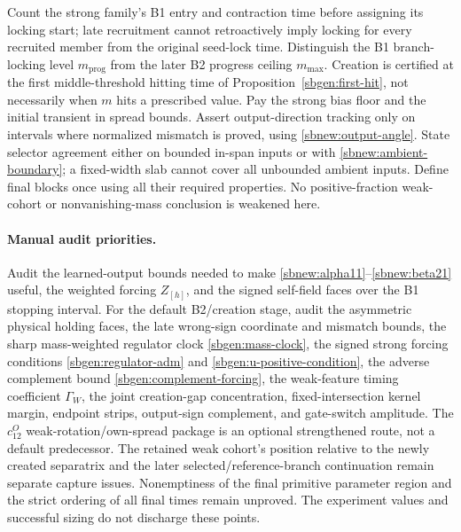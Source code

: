 \documentclass{article} %
\theoremstyle{plain}
\theoremstyle{definition}
\theoremstyle{remark}
\begin{document}
Count the strong family's B1 entry and contraction time before assigning its
locking start; late recruitment cannot retroactively imply locking for every
recruited member from the original seed-lock time. Distinguish the B1 branch-locking level $m_{\mathrm{prog}}$ from the
later B2 progress ceiling $m_{\max}$.  Creation is certified at the first
middle-threshold hitting time of Proposition~\ref{sbgen:first-hit}, not
necessarily when $m$ hits a prescribed value.  Pay the strong bias floor and
the initial transient in spread bounds. Assert output-direction tracking only on intervals where
normalized mismatch is proved, using \eqref{sbnew:output-angle}. State
selector agreement either on bounded in-span inputs or with
\eqref{sbnew:ambient-boundary}; a fixed-width slab cannot cover all unbounded
ambient inputs. Define final blocks once using all their required properties.
No positive-fraction weak-cohort or nonvanishing-mass conclusion is weakened
here.

\paragraph{Manual audit priorities.}
Audit the learned-output bounds needed to make
\eqref{sbnew:alpha11}--\eqref{sbnew:beta21} useful, the weighted forcing
$Z_{[h]}$, and the signed self-field faces over the B1 stopping interval.
For the default B2/creation stage, audit the asymmetric physical holding
faces, the late wrong-sign coordinate and mismatch bounds, the sharp
mass-weighted regulator clock \eqref{sbgen:mass-clock}, the signed strong
forcing conditions \eqref{sbgen:regulator-adm} and
\eqref{sbgen:u-positive-condition}, the adverse complement bound
\eqref{sbgen:complement-forcing}, the weak-feature timing coefficient
$\Gamma_W$, the joint creation-gap concentration, fixed-intersection kernel
margin, endpoint strips, output-sign complement, and gate-switch amplitude.
The $c_{12}^O$ weak-rotation/own-spread package is an optional strengthened
route, not a default predecessor.
The retained weak cohort's position relative to the newly created separatrix
and the later selected/reference-branch continuation remain separate capture
issues. Nonemptiness of the final primitive parameter region and the strict
ordering of all final times remain unproved. The experiment values and
successful sizing do not discharge these points.
\end{document}
